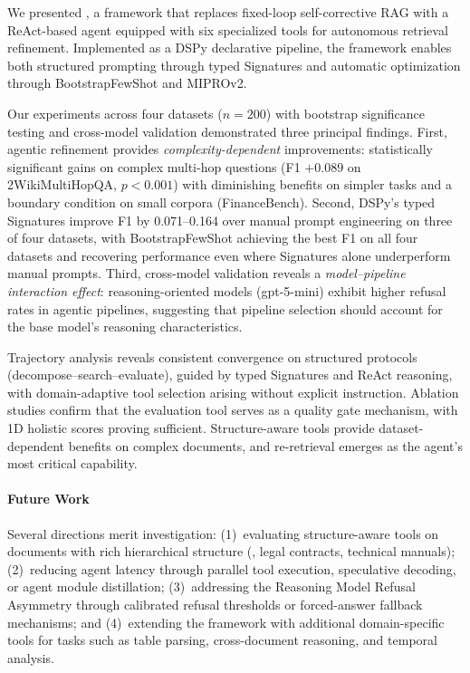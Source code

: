 
We presented \ours{}, a framework that replaces fixed-loop self-corrective RAG with a ReAct-based agent equipped with six specialized tools for autonomous retrieval refinement.
Implemented as a DSPy declarative pipeline, the framework enables both structured prompting through typed Signatures and automatic optimization through BootstrapFewShot and MIPROv2.

Our experiments across four datasets ($n = 200$) with bootstrap significance testing and cross-model validation demonstrated three principal findings.
First, agentic refinement provides \emph{complexity-dependent} improvements: statistically significant gains on complex multi-hop questions (F1 $+0.089$ on 2WikiMultiHopQA, $p < 0.001$) with diminishing benefits on simpler tasks and a boundary condition on small corpora (FinanceBench).
Second, DSPy's typed Signatures improve F1 by 0.071--0.164 over manual prompt engineering on three of four datasets, with BootstrapFewShot achieving the best F1 on all four datasets and recovering performance even where Signatures alone underperform manual prompts.
Third, cross-model validation reveals a \emph{model--pipeline interaction effect}: reasoning-oriented models (gpt-5-mini) exhibit higher refusal rates in agentic pipelines, suggesting that pipeline selection should account for the base model's reasoning characteristics.

Trajectory analysis reveals consistent convergence on structured protocols (decompose--search--evaluate), guided by typed Signatures and ReAct reasoning, with domain-adaptive tool selection arising without explicit instruction.
Ablation studies confirm that the evaluation tool serves as a quality gate mechanism, with 1D holistic scores proving sufficient. Structure-aware tools provide dataset-dependent benefits on complex documents, and re-retrieval emerges as the agent's most critical capability.

\paragraph{Future Work}
Several directions merit investigation:
(1)~evaluating structure-aware tools on documents with rich hierarchical structure (\eg, legal contracts, technical manuals);
(2)~reducing agent latency through parallel tool execution, speculative decoding, or agent module distillation;
(3)~addressing the Reasoning Model Refusal Asymmetry through calibrated refusal thresholds or forced-answer fallback mechanisms;
and (4)~extending the framework with additional domain-specific tools for tasks such as table parsing, cross-document reasoning, and temporal analysis.
